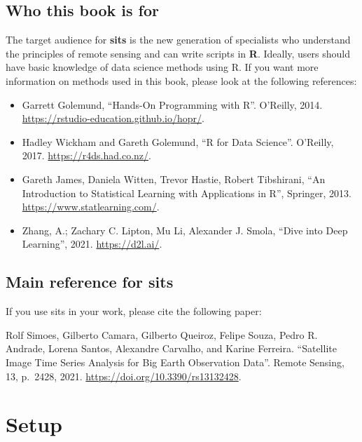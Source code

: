 \documentclass[
  11pt,
]{report}
\begin{document}
\hypertarget{who-this-book-is-for}{%
\section*{Who this book is for}\label{who-this-book-is-for}}

The target audience for \textbf{sits} is the new generation of
specialists who understand the principles of remote sensing and can
write scripts in \textbf{R}. Ideally, users should have basic knowledge
of data science methods using R. If you want more information on methods
used in this book, please look at the following references:

\begin{itemize}
\item
  Garrett Golemund, ``Hands-On Programming with R''. O'Reilly, 2014.
  \url{https://rstudio-education.github.io/hopr/}.
\item
  Hadley Wickham and Gareth Golemund, ``R for Data Science''. O'Reilly,
  2017. \url{https://r4ds.had.co.nz/}.
\item
  Gareth James, Daniela Witten, Trevor Hastie, Robert Tibshirani, ``An
  Introduction to Statistical Learning with Applications in R'',
  Springer, 2013. \url{https://www.statlearning.com/}.
\item
  Zhang, A.; Zachary C. Lipton, Mu Li, Alexander J. Smola, ``Dive into
  Deep Learning'', 2021. \url{https://d2l.ai/}.
\end{itemize}

\hypertarget{main-reference-for-sits}{%
\section*{Main reference for sits}\label{main-reference-for-sits}}

If you use sits in your work, please cite the following paper:

Rolf Simoes, Gilberto Camara, Gilberto Queiroz, Felipe Souza, Pedro R.
Andrade, Lorena Santos, Alexandre Carvalho, and Karine Ferreira.
``Satellite Image Time Series Analysis for Big Earth Observation Data''.
Remote Sensing, 13, p.~2428, 2021.
\url{https://doi.org/10.3390/rs13132428}.

\hypertarget{setup}{%
\chapter*{Setup}\label{setup}}
\end{document}
